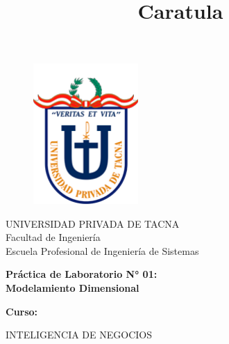 \documentclass[12pt,letterpaper]{article}
\begin{document}
%


\title{Caratula}

\begin{titlepage}
	\begin{center}
	
	\begin{figure}[htb]
	\begin{center}
	\includegraphics[width=4cm]{./Imagenes/UPT}
	\end{center}
	\end{figure}
	\vspace*{0.15in}
	\large{UNIVERSIDAD PRIVADA DE TACNA}\\
	\vspace*{0.10in}
	\large{Facultad de Ingeniería}\\
	\vspace*{0.10in}
	Escuela Profesional de Ingeniería de Sistemas  \\
	
\hfill \break
	
	\vspace*{0.1in}
	\begin{Large}
	\textbf{Práctica de Laboratorio N° 01: \\ Modelamiento Dimensional} \\
	\end{Large}
\hfill \break
	
	\vspace*{0.3in}
	\begin{Large}
	\textbf{Curso:} \\
	\end{Large}
	
	\vspace*{0.1in}
	\begin{large}
	INTELIGENCIA DE NEGOCIOS\\
	\end{large}
	

\end{center}
\end{titlepage}
\end{document}

